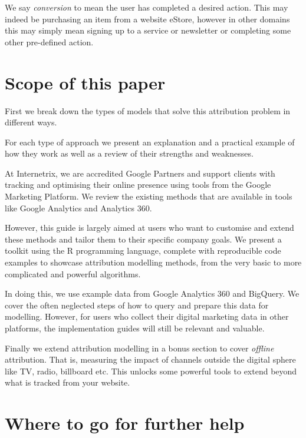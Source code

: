 \documentclass[]{book}
\begin{document}
We say \emph{conversion} to mean the user has completed a desired action. This may
indeed be purchasing an item from a website eStore, however in other domains
this may simply mean signing up to a service or newsletter or completing some
other pre-defined action.

\hypertarget{scope-of-this-paper}{%
\section{Scope of this paper}\label{scope-of-this-paper}}

First we break down the types of models that solve this attribution problem in different ways.

For each type of approach we present an explanation and a practical example
of how they work as well as a review of their strengths and weaknesses.

At Internetrix, we are accredited Google Partners and support clients with
tracking and optimising their online presence using tools from the Google
Marketing Platform. We review the existing methods that are available in
tools like Google Analytics and Analytics 360.

However, this guide is largely aimed at users who want to customise and extend
these methods and tailor them to their specific company goals. We present
a toolkit using the R programming language, complete with reproducible code examples
to showcase attribution modelling methods, from the very
basic to more complicated and powerful algorithms.

In doing this, we use example data from Google Analytics 360 and BigQuery. We cover
the often neglected steps of how to query and prepare this data for modelling. However,
for users who collect their digital marketing data in other platforms, the
implementation guides will still be relevant and valuable.

Finally we extend attribution modelling in a bonus section to cover \emph{offline}
attribution. That is, measuring the impact of channels outside the digital sphere
like TV, radio, billboard etc. This unlocks some powerful tools to extend
beyond what is tracked from your website.

\hypertarget{where-to-go-for-further-help}{%
\section{Where to go for further help}\label{where-to-go-for-further-help}}
\end{document}

